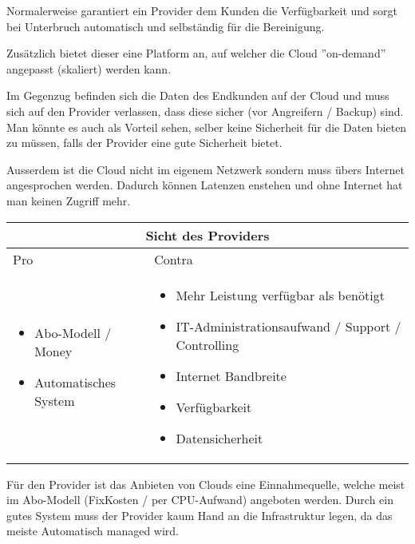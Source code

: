 \documentclass[11pt,titlepage]{article}
\begin{document}
Normalerweise garantiert ein Provider dem Kunden die Verfügbarkeit und sorgt bei Unterbruch automatisch und selbständig für die Bereinigung.

Zusätzlich bietet dieser eine Platform an, auf welcher die Cloud ''on-demand'' angepasst (skaliert) werden kann.

\par\medskip

Im Gegenzug befinden sich die Daten des Endkunden auf der Cloud und muss sich auf den Provider verlassen, dass diese sicher (vor Angreifern / Backup) sind. Man könnte es auch als Vorteil sehen, selber keine Sicherheit für die Daten bieten zu müssen, falls der Provider eine gute Sicherheit bietet.

Ausserdem ist die Cloud nicht im eigenem Netzwerk sondern muss übers Internet angesprochen werden. Dadurch können Latenzen enstehen und ohne Internet hat man keinen Zugriff mehr.

\par\medskip\medskip

\begin{tabular}{ |p{7cm}|p{7cm}|  }
  \hline
  \multicolumn{2}{|c|}{Sicht des Providers} \\
  \hline
  Pro & Contra \\
  \hline
  \begin{itemize}
    \item Abo-Modell / Money
    \item Automatisches System
  \end{itemize}
  &
  \begin{itemize}
    \item Mehr Leistung verfügbar als benötigt
    \item IT-Administrationsaufwand / Support / Controlling
    \item Internet Bandbreite
    \item Verfügbarkeit
    \item Datensicherheit
  \end{itemize}
  \\
  \hline
\end{tabular}

\par\medskip

Für den Provider ist das Anbieten von Clouds eine Einnahmequelle, welche meist im Abo-Modell (FixKosten / per CPU-Aufwand) angeboten werden.
Durch ein gutes System muss der Provider kaum Hand an die Infrastruktur legen, da das meiste Automatisch managed wird.
\end{document}

